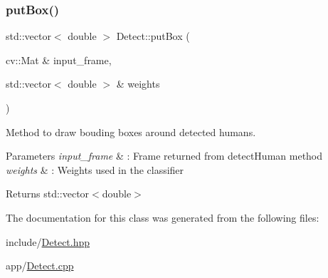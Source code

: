 \subsubsection{\texorpdfstring{put\+Box()}{putBox()}}
{\footnotesize\ttfamily std\+::vector$<$ double $>$ Detect\+::put\+Box (\begin{DoxyParamCaption}\item[{cv\+::\+Mat \&}]{input\+\_\+frame,  }\item[{std\+::vector$<$ double $>$ \&}]{weights }\end{DoxyParamCaption})}



Method to draw bouding boxes around detected humans. 


\begin{DoxyParams}{Parameters}
{\em input\+\_\+frame} & \+: Frame returned from detect\+Human method \\
\hline
{\em weights} & \+: Weights used in the classifier \\
\hline
\end{DoxyParams}
\begin{DoxyReturn}{Returns}
std\+::vector$<$double$>$ 
\end{DoxyReturn}


The documentation for this class was generated from the following files\+:\begin{DoxyCompactItemize}
\item 
include/\hyperlink{Detect_8hpp}{Detect.\+hpp}\item 
app/\hyperlink{Detect_8cpp}{Detect.\+cpp}\end{DoxyCompactItemize}
